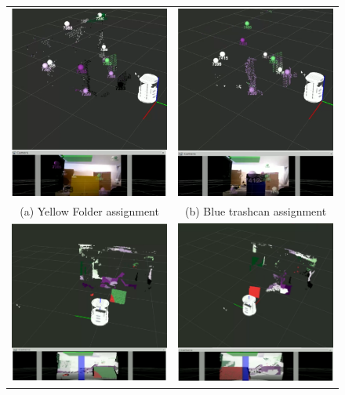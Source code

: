\documentclass[twoside,hidelinks]{article}
\begin{document}
\begin{figure}

\begin{tabular}{cc}
  \includegraphics[width=.45\textwidth]{colorBound5} &   \includegraphics[width=.45\textwidth]{colorBound6} \\
(a) Yellow Folder assignment  & (b) Blue trashcan assignment \\[6pt]
	\includegraphics[width=.45\textwidth]{posBound5} &   \includegraphics[width=.45\textwidth]{posBound6} \\

\end{tabular}
\end{figure}
\end{document}
